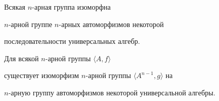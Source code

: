 \begin{cor}


Всякая $n$-арная группа изоморфна


$n$-арной группе $n$-арных автоморфизмов некоторой


последовательности универсальных алгебр.


\end{cor}





\begin{cor}


Для всякой $n$-арной группы $\langle  A, f \rangle $


существует изоморфизм $n$-арной группы $\langle A^{n-1}, g \rangle $ на


$n$-арную группу автоморфизмов некоторой универсальной алгебры.


\end{cor}





